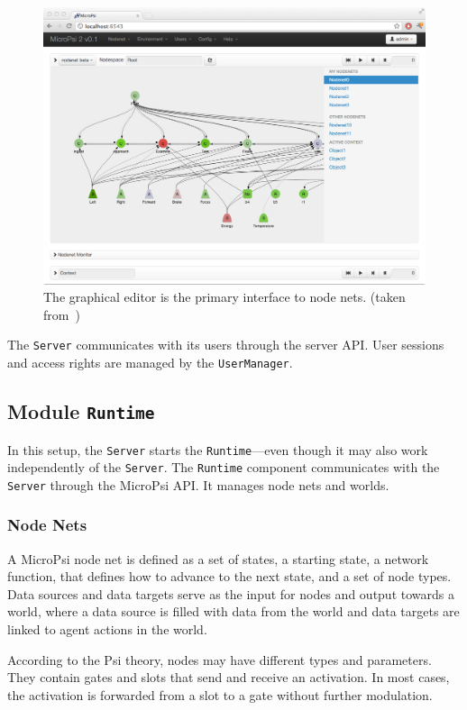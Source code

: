 \begin{figure}[h]
  \centering
    \includegraphics[width=13cm]{graphics/micropsi2_nodenet}
  \caption{The graphical editor is the primary interface to node nets. (taken from~\cite{conf/agi/Bach12})}
  \label{micropsi2_nodenet}
\end{figure}

The \texttt{Server} communicates with its users through the server API. User sessions and access rights are managed by the \texttt{UserManager}.
   
        \subsection{Module \texttt{Runtime}}
In this setup, the \texttt{Server} starts the \texttt{Runtime}---even though it may also work independently of the \texttt{Server}. The \texttt{Runtime} component communicates with the \texttt{Server} through the MicroPsi API. It manages node nets and worlds.

        \subsubsection{Node Nets}
  
A MicroPsi node net is defined as a set of states, a starting state, a network function, that defines how to advance to the next state, and a set of node types. Data sources and data targets serve as the input for nodes and output towards a world, where a data source is filled with data from the world and data targets are linked to agent actions in the world.

According to the Psi theory, nodes may have different types and parameters. They contain gates and slots that send and receive an activation. In most cases, the activation is forwarded from a slot to a gate without further modulation.

